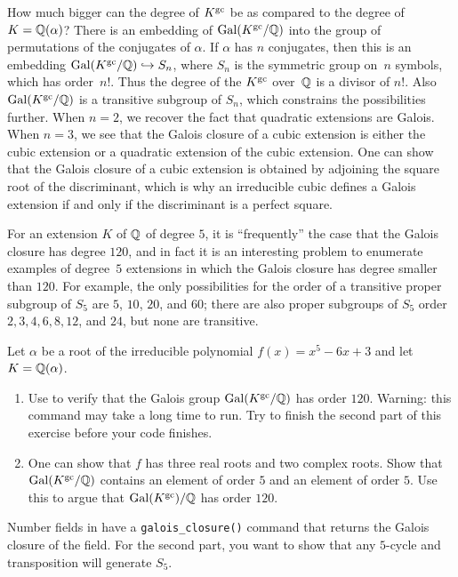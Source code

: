 How much bigger can the degree of $K^{\operatorname{gc}}$ be as compared to the
degree of $K=\mathbb{Q}(\alpha)$? There is an embedding of $\operatorname{Gal}(K^{\operatorname{gc}}/\mathbb{Q})$
into the group of permutations of the conjugates of $\alpha$.
If $\alpha$ has $n$ conjugates, then this is an embedding
$\operatorname{Gal}(K^{\operatorname{gc}}/\mathbb{Q})\hookrightarrow S_n$, where $S_n$ is the symmetric group on~$n$
symbols, which has order~$n!$. Thus the degree of the $K^{\operatorname{gc}}$ over~$\mathbb{Q}$
is a divisor of $n!$. Also $\operatorname{Gal}(K^{\operatorname{gc}}/\mathbb{Q})$ is a transitive
subgroup of $S_n$, which constrains the possibilities further.
When $n=2$, we recover the fact that quadratic extensions are Galois.
When $n=3$, we see that the Galois closure of a cubic extension is either
the cubic extension or a quadratic extension of the cubic extension.
One can show that the Galois closure of a cubic extension is obtained
by adjoining the square root of the discriminant, which is why an
irreducible cubic defines a Galois extension if and only if the discriminant
is a perfect square.

For an extension $K$ of $\mathbb{Q}$ of degree $5$, it is ``frequently'' the case that
the Galois closure has degree $120$, and in fact it is an interesting problem
to enumerate examples of degree~$5$ extensions in which the Galois closure
has degree smaller than $120$. For example, the only possibilities for the
order of a transitive proper subgroup of $S_5$ are $5$, $10$, $20$, and $60$;
there are also proper subgroups of $S_5$ order $2, 3, 4, 6, 8, 12$, and $24$,
but none are transitive.

\begin{exercise}
	Let $\alpha$ be a root of the irreducible polynomial $f(x) = x^5 - 6x + 3$ and
	let $K = \mathbb{Q}(\alpha)$.
	
	\begin{enumerate}
		\item
		Use \sage to verify that the Galois group $\operatorname{Gal}(K^{\operatorname{gc}}/\mathbb{Q})$
		has order $120$.
		Warning: this command may take a long time to run.
		Try to finish the second part of this exercise before your code
		finishes.
		
		\item
		One can show that $f$ has three real roots and two complex roots.
		Show that $\operatorname{Gal}(K^{\operatorname{gc}}/\mathbb{Q})$ contains an element of order $5$ and
		an element of order $5$. Use this to argue that $\operatorname{Gal}(K^{\operatorname{gc}})/\mathbb{Q}$
		has order $120$.
	\end{enumerate}
	
	\begin{hint}
		Number fields in \sage have a {\tt galois\_closure()} command that
		returns the Galois closure of the field.
		For the second part, you want to show that any $5$-cycle and transposition
		will generate $S_5$.
	\end{hint}
\end{exercise}

